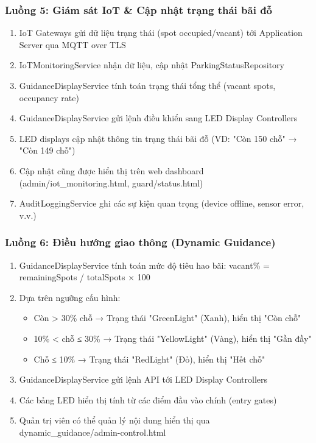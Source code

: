 \subsubsection{Luồng 5: Giám sát IoT \& Cập nhật trạng thái bãi đỗ}

\begin{enumerate}
    \item IoT Gateways gửi dữ liệu trạng thái (spot occupied/vacant) tới Application Server qua MQTT over TLS
    \item IoTMonitoringService nhận dữ liệu, cập nhật ParkingStatusRepository
    \item GuidanceDisplayService tính toán trạng thái tổng thể (vacant spots, occupancy rate)
    \item GuidanceDisplayService gửi lệnh điều khiển sang LED Display Controllers
    \item LED displays cập nhật thông tin trạng thái bãi đỗ (VD: "Còn 150 chỗ" → "Còn 149 chỗ")
    \item Cập nhật cũng được hiển thị trên web dashboard (admin/iot\_monitoring.html, guard/status.html)
    \item AuditLoggingService ghi các sự kiện quan trọng (device offline, sensor error, v.v.)
\end{enumerate}

\subsubsection{Luồng 6: Điều hướng giao thông (Dynamic Guidance)}

\begin{enumerate}
    \item GuidanceDisplayService tính toán mức độ tiêu hao bãi: vacant\% = remainingSpots / totalSpots × 100
    \item Dựa trên ngưỡng cấu hình:
    \begin{itemize}
        \item Còn > 30\% chỗ → Trạng thái "GreenLight" (Xanh), hiển thị "Còn chỗ"
        \item 10\% < chỗ ≤ 30\% → Trạng thái "YellowLight" (Vàng), hiển thị "Gần đầy"
        \item Chỗ ≤ 10\% → Trạng thái "RedLight" (Đỏ), hiển thị "Hết chỗ"
    \end{itemize}
    \item GuidanceDisplayService gửi lệnh API tới LED Display Controllers
    \item Các bảng LED hiển thị tính từ các điểm đầu vào chính (entry gates)
    \item Quản trị viên có thể quản lý nội dung hiển thị qua dynamic\_guidance/admin-control.html
\end{enumerate}

